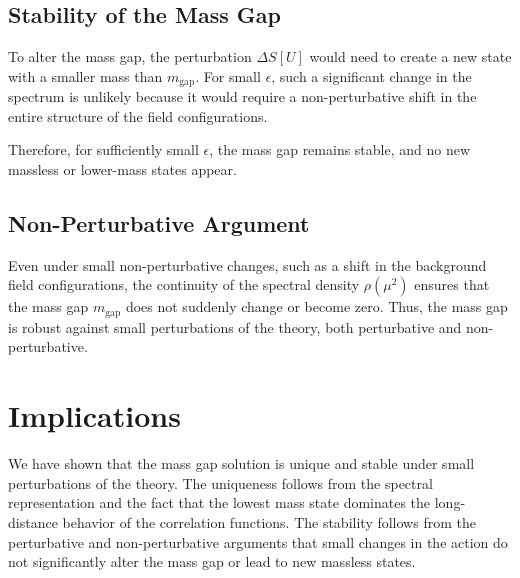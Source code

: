 \subsection{Stability of the Mass Gap}

To alter the mass gap, the perturbation \(\Delta S[U]\) would need to create a new state with a smaller mass than \(m_{\text{gap}}\). For small \(\epsilon\), such a significant change in the spectrum is unlikely because it would require a non-perturbative shift in the entire structure of the field configurations.

Therefore, for sufficiently small \(\epsilon\), the mass gap remains stable, and no new massless or lower-mass states appear.

\subsection{Non-Perturbative Argument}

Even under small non-perturbative changes, such as a shift in the background field configurations, the continuity of the spectral density \(\rho(\mu^2)\) ensures that the mass gap \(m_{\text{gap}}\) does not suddenly change or become zero. Thus, the mass gap is robust against small perturbations of the theory, both perturbative and non-perturbative.



\section{Implications}

We have shown that the mass gap solution is unique and stable under small perturbations of the theory. The uniqueness follows from the spectral representation and the fact that the lowest mass state dominates the long-distance behavior of the correlation functions. The stability follows from the perturbative and non-perturbative arguments that small changes in the action do not significantly alter the mass gap or lead to new massless states.
